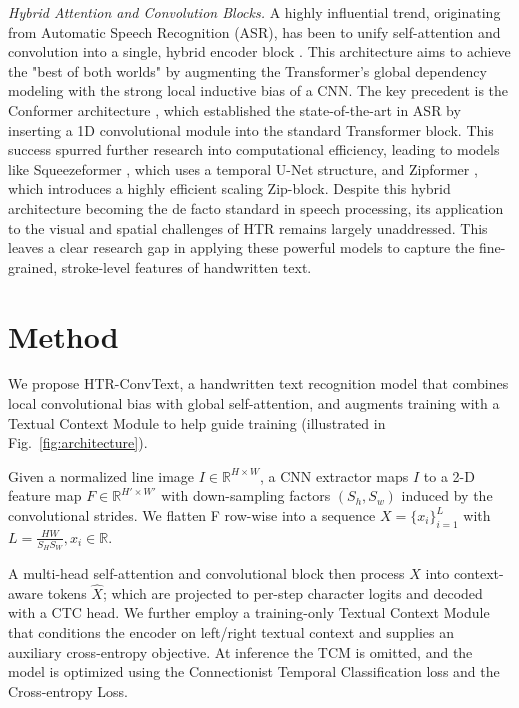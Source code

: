\documentclass[final,5p,times]{elsarticle}
\begin{document}
\textit{Hybrid Attention and Convolution Blocks.} A highly influential trend, originating from Automatic Speech Recognition (ASR), has been to unify self-attention and convolution into a single, hybrid encoder block \cite{gulati2020}. This architecture aims to achieve the "best of both worlds" by augmenting the Transformer's global dependency modeling with the strong local inductive bias of a CNN. The key precedent is the Conformer architecture \cite{gulati2020}, which established the state-of-the-art in ASR by inserting a 1D convolutional module into the standard Transformer block. This success spurred further research into computational efficiency, leading to models like Squeezeformer \cite{kim2022squeeze}, which uses a temporal U-Net structure, and Zipformer \cite{li2023zipformer}, which introduces a highly efficient scaling Zip-block.
Despite this hybrid architecture becoming the de facto standard in speech processing, its application to the visual and spatial challenges of HTR remains largely unaddressed. This leaves a clear research gap in applying these powerful models to capture the fine-grained, stroke-level features of handwritten text.

\section{Method}
We propose HTR-ConvText, a handwritten text recognition model that combines local convolutional bias with global self-attention, and augments training with a Textual Context Module to help guide training (illustrated in Fig.~\ref{fig:architecture}).


Given a normalized line image $I \in \mathbb{R}^{H \times W}$, a CNN extractor maps $I$ to a 2-D feature map $F \in \mathbb{R}^{H' \times W'}$ with down-sampling factors $(S_h,S_w)$ induced by the convolutional strides. We flatten F row-wise into a sequence $X=\{x_i\}_{i=1}^L$ with $L=\frac{HW}{S_H S_W} ,x_i \in \mathbb{R}$.

A multi-head self-attention and convolutional block then process $X$ into context-aware tokens $\hat{X}$; which are projected to per-step character logits and decoded with a CTC head. We further employ a training-only Textual Context Module that conditions the encoder on left/right textual context and supplies an auxiliary cross-entropy objective. At inference the TCM is omitted, and the model is optimized using the Connectionist Temporal Classification loss and the Cross-entropy Loss.
\end{document}
